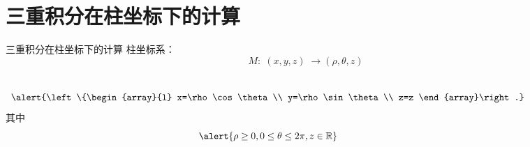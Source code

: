 \section{三重积分在柱坐标下的计算}

\begin{frame}{三重积分在柱坐标下的计算}
	\linespread{1.2}\pause 
	{\bb 柱坐标系：}\pause 
	$$M:\;(x,y,z)\;\to(\rho,\theta,z)$$
	\vspace{-2em}
	\begin{columns}\pause 
			$$\alert{\left\{\begin{array}{l}
				x=\rho\cos\theta\\
				y=\rho\sin\theta\\
				z=z
			\end{array}\right.}$$
			\pause 其中
			$$\alert{\rho\geq 0,0\leq\theta\leq 2\pi,z\in\mathbb{R}}$$
		\pause 
			\begin{center}
			\end{center}
	\end{columns}
\end{frame}


